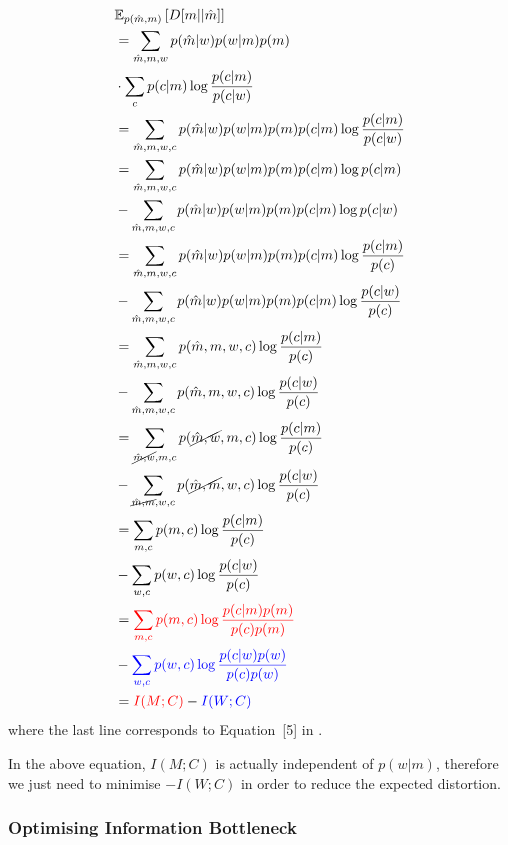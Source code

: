 \documentclass[11pt]{article}
\begin{document}
\begin{align*}
        & \mathbb{E}_{p(\hat{m},m)}\left[D[m||\hat{m}]\right] \\
        & = \sum_{\hat{m},m,w} p(\hat{m}|w)p(w|m)p(m) \\ 
        & \cdot \sum_{c} p(c|m) \log \frac{p(c|m)}{p(c|w)} \\
        & = \sum_{\hat{m},m,w,c} p(\hat{m}|w)p(w|m)p(m)p(c|m)\log \frac{p(c|m)}{p(c|w)} \\
        & = \sum_{\hat{m},m,w,c} p(\hat{m}|w)p(w|m)p(m)p(c|m) \log p(c|m) \\
        & - \sum_{\hat{m},m,w,c} p(\hat{m}|w)p(w|m)p(m)p(c|m) \log p(c|w) \\ 
        & = \sum_{\hat{m},m,w,c} p(\hat{m}|w)p(w|m)p(m)p(c|m) \log \frac{p(c|m)}{p(c)} \\ 
        & - \sum_{\hat{m},m,w,c} p(\hat{m}|w)p(w|m)p(m)p(c|m) \log \frac{p(c|w)}{p(c)} \\ 
        & = \sum_{\hat{m},m,w,c} p(\hat{m},m,w,c) \log \frac{p(c|m)}{p(c)} \\
        & - \sum_{\hat{m},m,w,c} p(\hat{m},m,w,c) \log \frac{p(c|w)}{p(c)} \\ 
        & = \sum_{\cancel{\hat{m},w},m,c} p(\cancel{\hat{m},w},m,c) \log \frac{p(c|m)}{p(c)} \\ 
        & - \sum_{\cancel{\hat{m},m},w,c} p(\cancel{\hat{m},m},w,c) \log \frac{p(c|w)}{p(c)} \\ 
        & = \sum_{m,c} p(m,c) \log \frac{p(c|m)}{p(c)} \\ 
        & - \sum_{w,c} p(w,c) \log \frac{p(c|w)}{p(c)} \\ 
        & = \textcolor{red}{\sum_{m,c} p(m,c) \log \frac{p(c|m)p(m)}{p(c)p(m)}} \\ 
        & - \textcolor{blue}{\sum_{w,c} p(w,c) \log \frac{p(c|w)p(w)}{p(c)p(w)}} \\  
        & = \textcolor{red}{I(M;C)} - \textcolor{blue}{I(W;C)} 
    \label{eq:factorise_distortion}
\end{align*}
where the last line corresponds to Equation~[5] in \citep{zaslavsky2018efficient}.

In the above equation, $I(M;C)$ is actually independent of $p(w|m)$, therefore we just need to minimise $-I(W;C)$ in order to reduce the expected distortion. 

\subsubsection{Optimising Information Bottleneck}
\label{ssec:comm_opt_ib}
\end{document}

